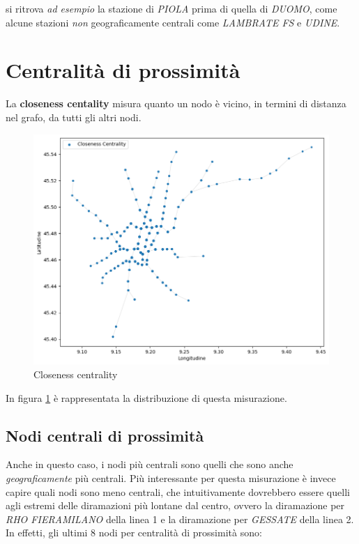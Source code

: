 si ritrova \textit{ad esempio} la stazione di \textit{PIOLA} prima di quella di \textit{DUOMO}, come alcune stazioni \textit{non} geograficamente centrali come \textit{LAMBRATE FS} e \textit{UDINE}.

\section{Centralità di prossimità}
La \textbf{closeness centality} misura quanto un nodo è vicino, in termini di distanza nel grafo, da tutti gli altri nodi.

\vspace{1em}
\begin{figure}[h!]
    \centering
    \includegraphics[width=0.8\linewidth]{Immagini//Capitoli//cap4/close_centr.png}
    \caption{Closeness centrality}
    \label{fig: Closeness Centrality}
\end{figure}
\vspace{1em}

In figura \ref{fig: Closeness Centrality} è rappresentata la distribuzione di questa misurazione.

\subsection{Nodi centrali di prossimità}
Anche in questo caso, i nodi più centrali sono quelli che sono anche \textit{geograficamente} più centrali. Più interessante per questa misurazione è invece capire quali nodi sono meno centrali, che intuitivamente dovrebbero essere quelli agli estremi delle diramazioni più lontane dal centro, ovvero la diramazione per \textit{RHO FIERAMILANO} della linea 1 e la diramazione per \textit{GESSATE} della linea 2. In effetti, gli ultimi 8 nodi per centralità di prossimità sono:

